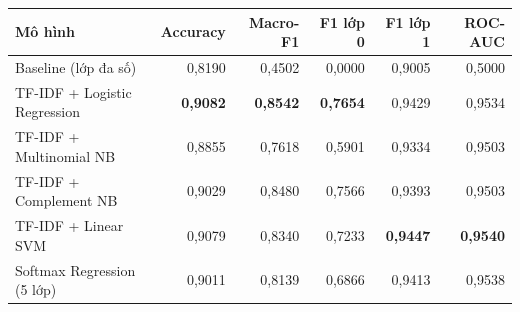 \begin{tabular}{lrrrrr}
\toprule
Mô hình & Accuracy & Macro-F1 & F1 lớp 0 & F1 lớp 1 & ROC-AUC \\
\midrule
Baseline (lớp đa số) & 0{,}8190 & 0{,}4502 & 0{,}0000 & 0{,}9005 & 0{,}5000 \\
TF-IDF + Logistic Regression & \textbf{0{,}9082} & \textbf{0{,}8542} & \textbf{0{,}7654} & 0{,}9429 & 0{,}9534 \\
TF-IDF + Multinomial NB & 0{,}8855 & 0{,}7618 & 0{,}5901 & 0{,}9334 & 0{,}9503 \\
TF-IDF + Complement NB & 0{,}9029 & 0{,}8480 & 0{,}7566 & 0{,}9393 & 0{,}9503 \\
TF-IDF + Linear SVM & 0{,}9079 & 0{,}8340 & 0{,}7233 & \textbf{0{,}9447} & \textbf{0{,}9540} \\
Softmax Regression (5 lớp) & 0{,}9011 & 0{,}8139 & 0{,}6866 & 0{,}9413 & 0{,}9538 \\
\bottomrule
\end{tabular}
